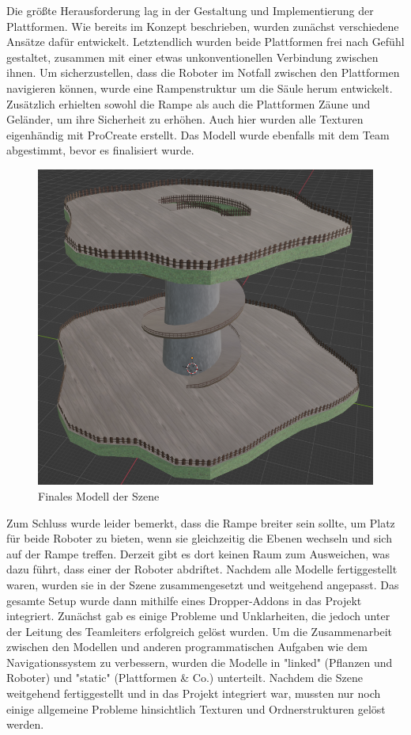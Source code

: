 Die größte Herausforderung lag in der Gestaltung und Implementierung der Plattformen. Wie bereits im Konzept beschrieben, wurden zunächst verschiedene Ansätze dafür entwickelt. Letztendlich wurden beide Plattformen frei nach Gefühl gestaltet, zusammen mit einer etwas unkonventionellen Verbindung zwischen ihnen. Um sicherzustellen, dass die Roboter im Notfall zwischen den Plattformen navigieren können, wurde eine Rampenstruktur um die Säule herum entwickelt. \cite{Blender 2.8x Curved/Spiral Road modeling (easy way)} Zusätzlich erhielten sowohl die Rampe als auch die Plattformen Zäune und Geländer, um ihre Sicherheit zu erhöhen. Auch hier wurden alle Texturen eigenhändig mit ProCreate erstellt. Das Modell wurde ebenfalls mit dem Team abgestimmt, bevor es finalisiert wurde.
\begin{figure}[H]
	\centering
	\includegraphics[height=0.3\pageheight,keepaspectratio]{pics/13}
	\caption{Finales Modell der Szene}
\end{figure}
Zum Schluss wurde leider bemerkt, dass die Rampe breiter sein sollte, um Platz für beide Roboter zu bieten, wenn sie gleichzeitig die Ebenen wechseln und sich auf der Rampe treffen. Derzeit gibt es dort keinen Raum zum Ausweichen, was dazu führt, dass einer der Roboter abdriftet.
Nachdem alle Modelle fertiggestellt waren, wurden sie in der Szene zusammengesetzt und weitgehend angepasst. Das gesamte Setup wurde dann mithilfe eines Dropper-Addons in das Projekt integriert. Zunächst gab es einige Probleme und Unklarheiten, die jedoch unter der Leitung des Teamleiters erfolgreich gelöst wurden. Um die Zusammenarbeit zwischen den Modellen und anderen programmatischen Aufgaben wie dem Navigationssystem zu verbessern, wurden die Modelle in "linked" (Pflanzen und Roboter) und "static" (Plattformen \& Co.) unterteilt.
Nachdem die Szene weitgehend fertiggestellt und in das Projekt integriert war, mussten nur noch einige allgemeine Probleme hinsichtlich Texturen und Ordnerstrukturen gelöst werden.

